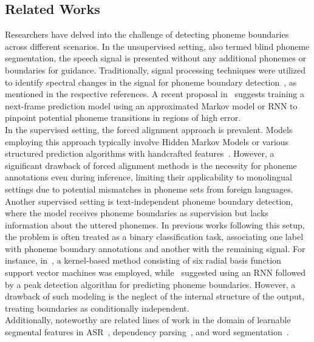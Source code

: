 \documentclass{article}
\begin{document}
\subsection{Related Works}
\begin{sloppypar}
Researchers have delved into the challenge of detecting phoneme boundaries across different scenarios. In the unsupervised setting, also termed blind phoneme segmentation, the speech signal is presented without any additional phonemes or boundaries for guidance. Traditionally, signal processing techniques were utilized to identify spectral changes in the signal for phoneme boundary detection~\cite{dusan2006relation, estevan2007finding, hoang2015blind, almpanidis2008phonemic, rasanen2011blind}, as mentioned in the respective references. A recent proposal in~\cite{michel2016blind} suggests training a next-frame prediction model using an approximated Markov model or RNN to pinpoint potential phoneme transitions in regions of high error.\\[5mm]
In the supervised setting, the forced alignment approach is prevalent. Models employing this approach typically involve Hidden Markov Models or various structured prediction algorithms with handcrafted features~\cite{keshet2005phoneme, mcauliffe2017montreal}. However, a significant drawback of forced alignment methods is the necessity for phoneme annotations even during inference, limiting their applicability to monolingual settings due to potential mismatches in phoneme sets from foreign languages.\\[5mm]
Another supervised setting is text-independent phoneme boundary detection, where the model receives phoneme boundaries as supervision but lacks information about the uttered phonemes. In previous works following this setup, the problem is often treated as a binary classification task, associating one label with phoneme boundary annotations and another with the remaining signal. For instance, in~\cite{king2013accurate}, a kernel-based method consisting of six radial basis function support vector machines was employed, while~\cite{franke2016phoneme} suggested using an RNN followed by a peak detection algorithm for predicting phoneme boundaries. However, a drawback of such modeling is the neglect of the internal structure of the output, treating boundaries as conditionally independent.\\[5mm]
Additionally, noteworthy are related lines of work in the domain of learnable segmental features in ASR~\cite{lu2016segmental}, dependency parsing~\cite{kiperwasser2016simple}, and word segmentation~\cite{adi2017sequence}.
\end{sloppypar}
\end{document}
